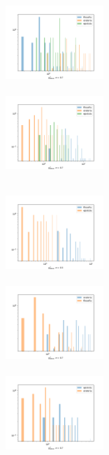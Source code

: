 \documentclass[10pt,a4paper,onecolumn]{article}
\theoremstyle{definition}
\theoremstyle{remark}
\begin{document}
\begin{figure}[htpb!]
\begin{multicols}{3}
		\includegraphics[width=0.33\textwidth]{graficos/histograma3_filosofia.png} \\ \vspace{0.15cm}   \\
		\includegraphics[width=0.33\textwidth]{graficos/histograma3_oratoria.png} \\ \vspace{0.15cm}  \\
	\end{multicols}
	\begin{multicols}{3}
		\includegraphics[width=0.33\textwidth]{graficos/histograma2_epistola_filosofia.png} \\ \vspace{0.15cm}  \\
		\includegraphics[width=0.33\textwidth]{graficos/histograma2_filosofia_oratoria.png} \\ \vspace{0.15cm}  \\
		\includegraphics[width=0.33\textwidth]{graficos/histograma2_oratoria_epistola.png} \\ \vspace{0.15cm}  \\

\end{multicols}
\end{figure}
\end{document}
